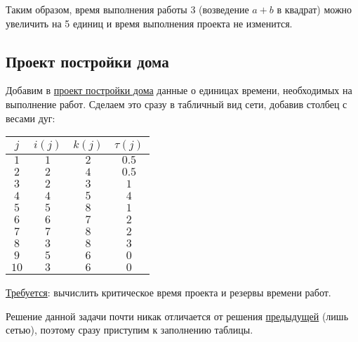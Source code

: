 Таким образом, время выполнения работы $3$ (возведение $a+b$ в квадрат) можно увеличить на 5 единиц и время выполнения проекта не изменится.

\subsection{Проект постройки дома}


Добавим в \hyperref[proj:house_building_project]{проект постройки дома} данные о единицах времени, необходимых на выполнение работ. Сделаем это сразу в табличный вид сети, добавив столбец с весами дуг:

\begin{table}[H]
	\centering
	\begin{tabular}{ | c | c | c | c |} 
		\hline
		$j$ & $i(j)$ & $k(j)$ & $\tau(j)$ \\ \hline
		
		$1$ & $1$ & $2$ & $0.5$ \\ \hline
		$2$ & $2$ & $4$ & $0.5$ \\ \hline
		$3$ & $2$ & $3$ & $1$ \\ \hline
		$4$ & $4$ & $5$ & $4$ \\ \hline
		$5$ & $5$ & $8$ & $1$ \\ \hline
		$6$ & $6$ & $7$ & $2$ \\ \hline
		$7$ & $7$ & $8$ & $2$ \\ \hline
		$8$ & $3$ & $8$ & $3$ \\ \hline
		$9$ & $5$ & $6$ & $0$ \\ \hline
		$10$ & $3$ & $6$ & $0$ \\ \hline
	\end{tabular}
\end{table}

\underline{Требуется}: вычислить критическое время проекта и резервы времени работ.

\solution

Решение данной задачи почти никак отличается от решения \hyperref[pr:math_expr_calc_time]{предыдущей} (лишь сетью), поэтому сразу приступим к заполнению таблицы.

\bigskip

